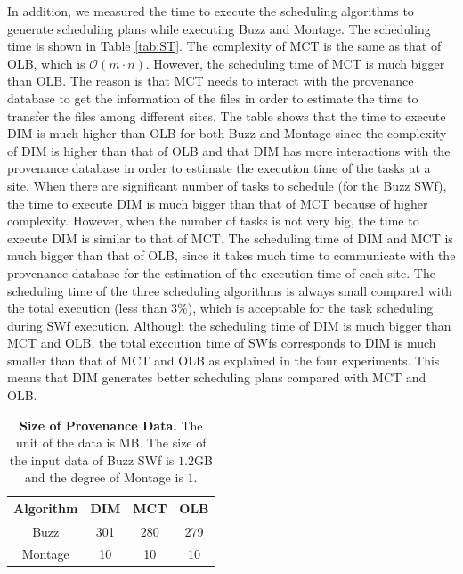In addition, we measured the time to execute the scheduling algorithms to generate scheduling plans while executing Buzz and Montage. The scheduling time is shown in Table \ref{tab:ST}. The complexity of MCT is the same as that of OLB, which is $\mathcal{O}(m\cdot n)$. 
However, the scheduling time of MCT is much bigger than OLB. The reason is that MCT needs to interact with the provenance database to get the information of the files in order to estimate the time to transfer the files among different sites.
The table shows that the time to execute DIM is much higher than OLB for both Buzz and Montage since the complexity of DIM is higher than that of OLB and that DIM has more interactions with the provenance database in order to estimate the execution time of the tasks at a site. When there are significant number of tasks to schedule (for the Buzz SWf), the time to execute DIM is much bigger than that of MCT because of higher complexity.
However, when the number of tasks is not very big, the time to execute DIM is similar to that of MCT. The scheduling time of DIM and MCT is much bigger than that of OLB, since it takes much time to communicate with the provenance database for the estimation of the execution time of each site.
The scheduling time of the three scheduling algorithms is always small compared with the total execution (less than $3$\%), which is acceptable for the task scheduling during SWf execution.
Although the scheduling time of DIM is much bigger than MCT and OLB, the total execution time of SWfs corresponds to DIM is much smaller than that of MCT and OLB as explained in the four experiments. This means that DIM generates better scheduling plans compared with MCT and OLB.


\begin{table}[htb]
\caption{\textbf{Size of Provenance Data. } The unit of the data is MB. The size of the input data of Buzz SWf is $1.2$GB and the degree of Montage is $1$.}
\label{tab:SPD}
\begin{centering}
\captionsetup{justification=centering}
\begin{tabular}{|c|c|c|c|}
\hline 
Algorithm & DIM & MCT & OLB \tabularnewline
\hline 
Buzz & 301 & 280 & 279 \tabularnewline
Montage & 10 & 10 & 10 \tabularnewline
\hline 
\end{tabular}
\par\end{centering} 
\end{table}


